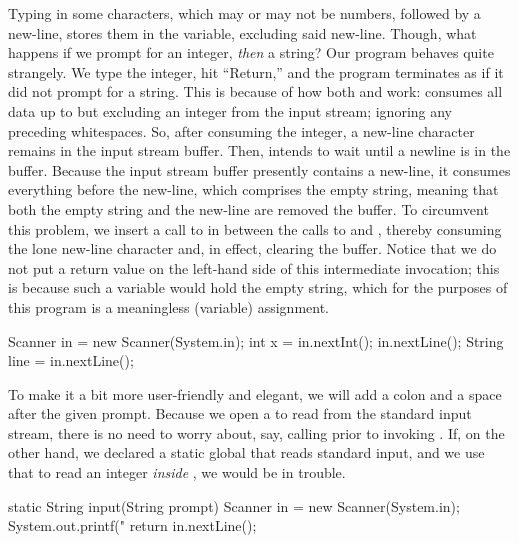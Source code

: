 Typing in some characters, which may or may not be numbers, followed by a new-line, stores them in the  variable, excluding said new-line. 
Though, what happens if we prompt for an integer, \emph{then} a string? 
Our program behaves quite strangely. 
We type the integer, hit ``Return,'' and the program terminates as if it did not prompt for a string. 
This is because of how both  and  work:  consumes all data up to but excluding an integer from the input stream; ignoring any preceding whitespaces. 
So, after consuming the integer, a new-line character remains in the input stream buffer. 
Then,  intends to wait until a newline is in the buffer. 
Because the input stream buffer presently contains a new-line, it consumes everything before the new-line, which comprises the empty string, meaning that both the empty string and the new-line are removed the buffer. 
To circumvent this problem, we insert a call to  in between the calls to  and , thereby consuming the lone new-line character and, in effect, clearing the buffer. 
Notice that we do not put a return value on the left-hand side of this intermediate  invocation; this is because such a variable would hold the empty string, which for the purposes of this program is a meaningless (variable) assignment.

\begin{verbnobox}[\small]
Scanner in = new Scanner(System.in);
int x = in.nextInt();
in.nextLine();
String line = in.nextLine();
\end{verbnobox}

To make it a bit more user-friendly and elegant, we will add a colon and a space after the given prompt. 
Because we open a  to read from the standard input stream, there is no need to worry about, say, calling  prior to invoking .
If, on the other hand, we declared a static global  that reads standard input, and we use that to read an integer \emph{inside} , we would be in trouble. 

\begin{verbnobox}[\small]
static String input(String prompt) {
  Scanner in = new Scanner(System.in);
  System.out.printf("%
  return in.nextLine();
}
\end{verbnobox}

